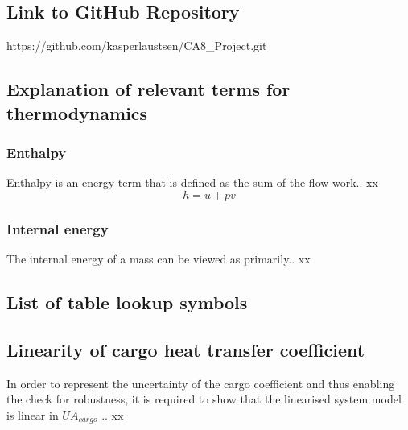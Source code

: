 \subsection{Link to GitHub Repository}
https://github.com/kasperlaustsen/CA8\_Project.git

\subsection{Explanation of relevant terms for thermodynamics}
\subsubsection{Enthalpy}
Enthalpy is an energy term that is defined as the sum of the flow work.. xx
\begin{equation}
	h = u + pv
\end{equation}

\subsubsection{Internal energy}
The internal energy of a mass can be viewed as primarily.. xx

\subsection{List of table lookup symbols}


\subsection{Linearity of cargo heat transfer coefficient}
In order to represent the uncertainty of the cargo coefficient and thus enabling the check for robustness, it is required to show that the linearised system model is linear in $ UA_{cargo} $ .. xx


